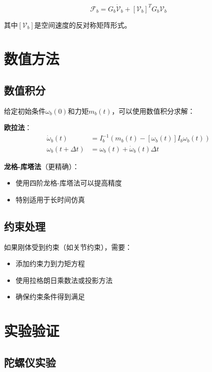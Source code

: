 \documentclass[12pt,a4paper]{article}
\begin{document}
\begin{equation}
\mathcal{F}_b = G_b \dot{\mathcal{V}}_b + [\mathcal{V}_b]^T G_b \mathcal{V}_b
\end{equation}

其中$[\mathcal{V}_b]$是空间速度的反对称矩阵形式。

\section{数值方法}

\subsection{数值积分}

给定初始条件$\omega_b(0)$和力矩$m_b(t)$，可以使用数值积分求解：

\textbf{欧拉法}：
\begin{align}
\dot{\omega}_b(t) &= I_b^{-1} (m_b(t) - [\omega_b(t)] I_b \omega_b(t)) \\
\omega_b(t + \Delta t) &= \omega_b(t) + \dot{\omega}_b(t) \Delta t
\end{align}

\textbf{龙格-库塔法}（更精确）：
\begin{itemize}
\item 使用四阶龙格-库塔法可以提高精度
\item 特别适用于长时间仿真
\end{itemize}

\subsection{约束处理}

如果刚体受到约束（如关节约束），需要：
\begin{itemize}
\item 添加约束力到力矩方程
\item 使用拉格朗日乘数法或投影方法
\item 确保约束条件得到满足
\end{itemize}

\section{实验验证}

\subsection{陀螺仪实验}
\end{document}
